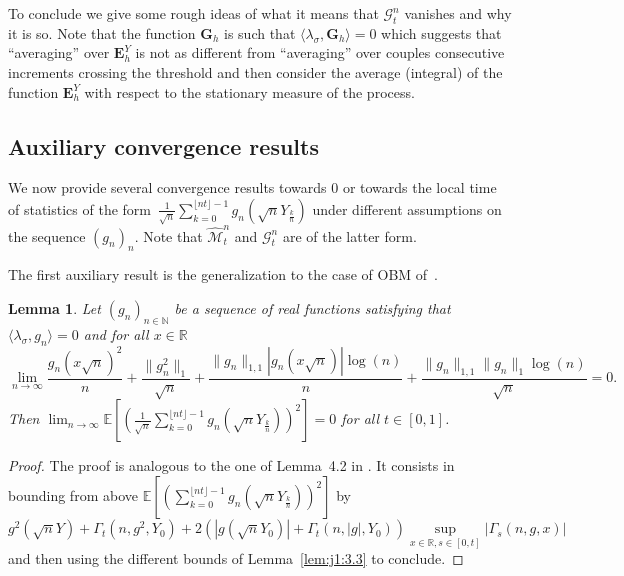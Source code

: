 \documentclass[12pt]{article}
\numberwithin{equation}{section}
\newtheorem{lemma}{Lemma}
\theoremstyle{definition}
\theoremstyle{remark}
\newcommand{\NN}{\mathbb{N}}
\newcommand{\RR}{\mathbb{R}}
\newcommand{\EE}{\mathbb{E}}
\newcommand{\cG}{\mathcal{G}}
\newcommand{\bfG}[1]{\mathbf{G}_{#1}}
\begin{document}
To conclude we give some rough ideas of what it means that $\cG^n_t$ vanishes and why it is so. Note that the function $\bfG{h}$ is such that $\langle \lambda_\sigma , \bfG{h} \rangle =0$ which suggests that {``averaging''} over $\mathbf{E}^Y_{h}$ is not as different from ``averaging'' over couples consecutive increments crossing the threshold and then consider the average (integral) of the function $\mathbf{E}^Y_{h}$ with respect to the stationary measure of the process.




\subsection{Auxiliary convergence results} \label{sec:aux:conv}

We now provide several convergence results towards 0 or towards the local time of statistics of the form~$\frac1{\sqrt{n}} \sum_{k=0}^{\lfloor n t \rfloor-1} g_n(\sqrt{n} Y_{\frac{k}n})$ under different assumptions on the sequence $(g_n)_{n}$.
Note that $\widehat{\mathcal{M}}^n_t$ and  $\cG^n_t$ are of the latter form.


The first auxiliary result is the generalization to the case of OBM of~\cite[Lemma~4.2]{j1}. 
\begin{lemma} \label{lem:j1:4.2}
Let $(g_n)_{n\in \NN}$ be a sequence of real functions satisfying that $\langle \lambda_\sigma , g_n \rangle=0$ and for all $x\in \RR$
\begin{equation} \label{eq:j1:4.2}
	\lim_{n\to\infty} \frac{g_n(x\sqrt{n})^2}{n}+ \frac{\|g_n^2\|_{1}}{\sqrt{n}} + \frac{\| g_n \|_{1,1}|g_n(x \sqrt{n})|\log(n)}{n} + \frac{\| g_n \|_{1,1} \|g_n\|_{1} \log(n)}{\sqrt{n}}
=0.
\end{equation}
Then
$\lim_{n\to\infty} \EE\!\left[\left(\frac{1}{\sqrt{n}}  \sum_{k=0}^{\lfloor n t \rfloor-1} g_n(\sqrt{n} Y_{\frac{k}n}) \right)^2\right]=0$
for all $t\in [0,1]$.
\end{lemma}
%
\begin{proof}
The proof is analogous to the one of Lemma~4.2 in \cite{j1}.
It consists in bounding from above 
$\EE\!\left[\left( \sum_{k=0}^{\lfloor n t \rfloor-1} g_n(\sqrt{n} Y_{\frac{k}n}) \right)^2\right]$
by 
\[g^2(\sqrt n Y) + \Gamma_t(n,g^2,Y_0) + 2 (|g(\sqrt n Y_0)| + \Gamma_t(n,|g|,Y_0)) \sup_{x\in \mathbb{R},s\in[0,t]} |\Gamma_s(n,g,x)|\] 
and then using the different bounds of Lemma~\ref{lem:j1:3.3} to conclude. 
\end{proof}
\end{document}
